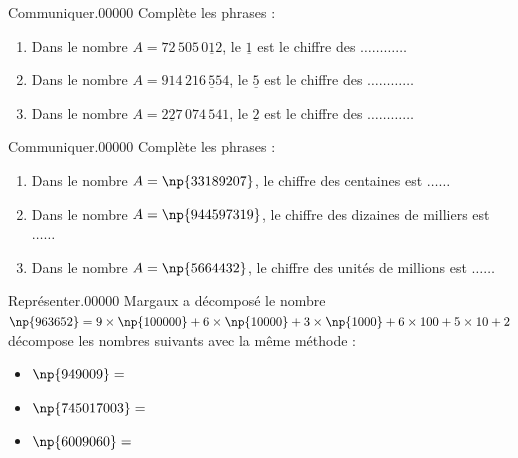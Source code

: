 \begin{pageAD}
\begin{ExoCadN}{Communiquer.}{0}{0}{0}{0}{0}
Complète les phrases :
\begin{enumerate}
\item Dans le nombre $A=72\,505\,0\underline{1}2$, le $\underline{1}$ est le chiffre des  $\ldots\ldots\ldots\ldots$
\item Dans le nombre $A=914\,216\,\underline{5}54$, le $\underline{5}$ est le chiffre des  $\ldots\ldots\ldots\ldots$
\item Dans le nombre $A=2\underline{2}7\,074\,541$, le $\underline{2}$ est le chiffre des  $\ldots\ldots\ldots\ldots$
\end{enumerate}
\end{ExoCadN}

\begin{ExoCadN}{Communiquer.}{0}{0}{0}{0}{0}
Complète les phrases :
\begin{enumerate}
\item Dans le nombre $A=\np{33189207}$, le chiffre des centaines est $\ldots\ldots$
\item Dans le nombre $A=\np{944597319}$, le chiffre des dizaines de milliers est $\ldots\ldots$
\item Dans le nombre $A=\np{5664432}$, le chiffre des unités de millions est $\ldots\ldots$
\end{enumerate}
\end{ExoCadN}


\begin{ExoCadN}{Représenter.}{0}{0}{0}{0}{0}
Margaux a décomposé le nombre $\np{963652}=9\times\np{100000}+6\times\np{10000}+3\times\np{1000}+6\times100+5\times10+2$ décompose les nombres suivants avec la même méthode :
\begin{itemize}
\item $\np{949009}=$
\item $\np{745017003}=$
\item $\np{6009060}=$
\end{itemize}
\end{ExoCadN}
 
\end{pageAD} %


